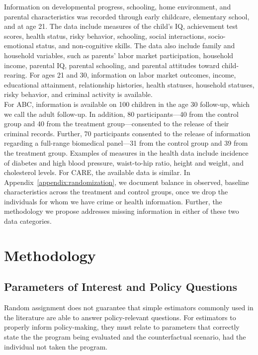 

\noindent Information on developmental progress, schooling, home environment, and parental characteristics was recorded through early childcare, elementary school, and at age 21. The data include measures of the child's IQ, achievement test scores, health status, risky behavior, schooling, social interactions, socio-emotional status, and non-cognitive skills. The data also include family and household variables, such as parents' labor market participation, household income, parental IQ, parental schooling, and parental attitudes toward child-rearing. For ages 21 and 30, information on labor market outcomes, income, educational attainment, relationship histories, health statuses, household statuses, risky behavior, and criminal activity is available.\\

\noindent For ABC, information is available on 100 children in the age 30 follow-up, which we call the adult follow-up. In addition, 80 participants---40 from the control group and 40 from the treatment group---consented to the release of their criminal records. Further, 70 participants consented to the release of information regarding a full-range biomedical panel---31 from the control group and 39 from the treatment group. Examples of measures in the health data include incidence of diabetes and high blood pressure, waist-to-hip ratio, height and weight, and cholesterol levels. For CARE, the available data is similar. In Appendix~\ref{appendix:randomization}, we document balance in observed, baseline characteristics across the treatment and control groups, once we drop the individuals for whom we have crime or health information. Further, the methodology we propose addresses missing information in either of these two data categories.

\section{Methodology} \label{section:methodology}

\subsection{Parameters of Interest and Policy Questions} \label{section:methodsquestions}

\noindent Random assignment does not guarantee that simple estimators commonly used in the literature are able to answer policy-relevant questions. For estimators to properly inform policy-making, they must relate to parameters that correctly state the the program being evaluated and the counterfactual scenario, had the individual not taken the program.\\

